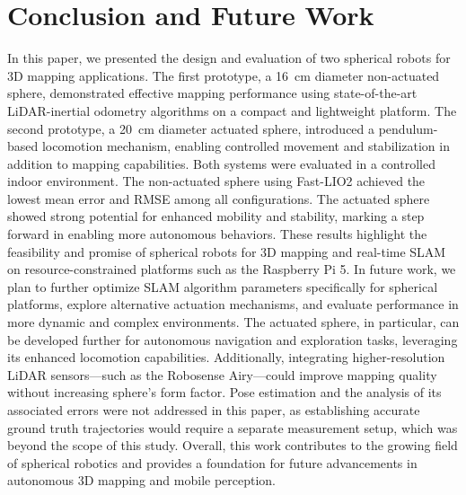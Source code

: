 \documentclass[conference]{IEEEtran}
\begin{document}
\section*{Conclusion and Future Work}
In this paper, we presented the design and evaluation of two spherical robots for 3D mapping applications. 
The first prototype, a \SI{16}{\centi\meter} diameter non-actuated sphere, demonstrated effective mapping performance using state-of-the-art LiDAR-inertial odometry algorithms on a compact and lightweight platform. 
The second prototype, a \SI{20}{\centi\meter} diameter actuated sphere, introduced a pendulum-based locomotion mechanism, enabling controlled movement and stabilization in addition to mapping capabilities. 
Both systems were evaluated in a controlled indoor environment. 
The non-actuated sphere using Fast-LIO2 achieved the lowest mean error and RMSE among all configurations. 
The actuated sphere showed strong potential for enhanced mobility and stability, marking a step forward in enabling more autonomous behaviors. 
These results highlight the feasibility and promise of spherical robots for 3D mapping and real-time SLAM on resource-constrained platforms such as the Raspberry Pi 5.
In future work, we plan to further optimize SLAM algorithm parameters specifically for spherical platforms, explore alternative actuation mechanisms, and evaluate performance in more dynamic and complex environments. 
The actuated sphere, in particular, can be developed further for autonomous navigation and exploration tasks, leveraging its enhanced locomotion capabilities. 
Additionally, integrating higher-resolution LiDAR sensors—such as the Robosense Airy—could improve mapping quality without increasing sphere's form factor. 
Pose estimation and the analysis of its associated errors were not addressed in this paper, as establishing accurate ground truth trajectories would require a separate measurement setup, which was beyond the scope of this study.
Overall, this work contributes to the growing field of spherical robotics and provides a foundation for future advancements in autonomous 3D mapping and mobile perception.



\vspace{12pt}
\end{document}
